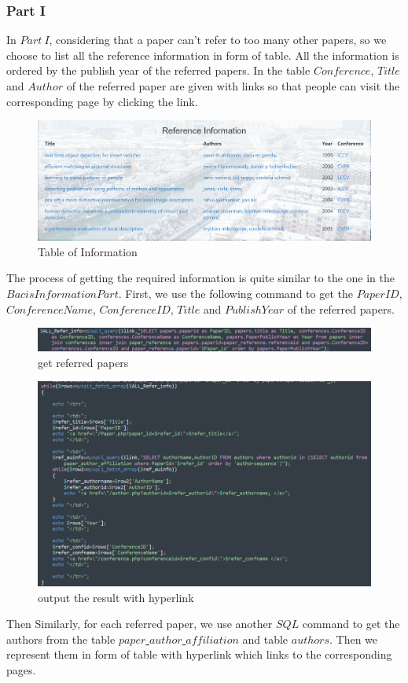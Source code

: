 \documentclass{article}
\begin{document}
	\subsubsection{Part I}
	In \(Part\ I\), considering that a paper can't refer to too many other papers, so we choose to list all the reference information in form of table. All the information is ordered by the publish year of the referred papers. In the table \(Conference\), \(Title\) and \(Author\) of the referred paper are given with links so that people can visit the corresponding page by clicking the link.
	\begin{figure}[H]
		\centering
		\includegraphics[width=0.9\linewidth]{p_3.png}
		\caption{Table of Information}
	\end{figure}
	\par The process of getting the required information is quite similar to the one in the \(Bacis Information Part\). First, we use the following command to get the \(PaperID\), \(ConferenceName\), \(ConferenceID\), \(Title\) and \(Publish Year\) of the referred papers.
	\begin{figure}[H]
		\centering
		\includegraphics[width=0.9\linewidth]{p_8.png}
		\caption{get referred papers}
	\end{figure}
	\begin{figure}[H]
		\centering
		\includegraphics[width=0.65\linewidth]{p_9.png}
		\caption{output the result with hyperlink}
	\end{figure}
	Then Similarly, for each referred paper, we use another \(SQL\) command to get the authors from the table \(paper\)\underline{ }\(author\)\underline{ }\(affiliation\) and table \(authors\). Then we represent them in form of table with hyperlink which links to the corresponding pages.
\end{document}
